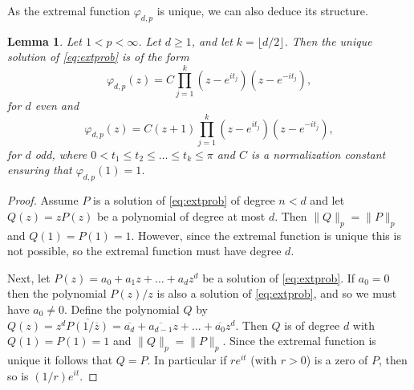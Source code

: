 \documentclass{amsart}
\theoremstyle{plain}
\newtheorem{lemma}[theorem]{Lemma}
\theoremstyle{remark}
\begin{document}
	
	As the extremal function $\varphi_{d, p}$ is unique, we can also deduce its structure. 
	
	\begin{lemma}\label{lem:structure}
		Let $1<p<\infty$. Let $d \geq 1$, and let $k=\lfloor d/2 \rfloor$. Then the unique solution of \eqref{eq:extprob} is of the form
		\[\varphi_{d, p}(z)= C\prod_{j=1}^{k} (z-e^{i t_j})(z-e^{-i t_j}),\]
		for $d$ even and 
		\[\varphi_{d, p}(z)=C(z+1) \prod_{j=1}^{k} (z-e^{i t_j})(z-e^{-i t_j}),\]
		for $d$ odd, where $0 < t_1 \leq t_2 \leq \dots \leq t_{k} \leq \pi$ and $C$ is a normalization constant ensuring that $\varphi_{d,p}(1)=1$.
	\end{lemma}
	
	\begin{proof}
		Assume $P$ is a solution of \eqref{eq:extprob} of degree $n<d$ and let $Q(z)=zP(z)$ be a polynomial of degree at most $d$. Then $\|Q\|_p=\|P\|_p$ and $Q(1)=P(1)=1$. However, since the extremal function is unique this is not possible, so the extremal function must have degree $d$.
		
		Next, let $P(z)=a_0+a_1 z + \dots + a_d z^d$ be a solution of \eqref{eq:extprob}. If $a_0=0$ then the polynomial $P(z)/z$ is also a solution of \eqref{eq:extprob}, and so we must have $a_0 \neq 0$. Define the polynomial $Q$ by $Q(z)=z^d \overline{P(1/\overline{z})}=\overline{a_d}+ \overline{a_{d-1}}z + \dots + \overline{a_0}z^d$. Then $Q$ is of degree $d$ with $Q(1)=P(1)=1$ and $\|Q\|_p=\|P\|_p$. Since the extremal function is unique it follows that $Q=P$. In particular if $re^{i t}$ (with $r>0$) is a zero of $P$, then so is $(1/r) e^{i t}$. 
		

\end{proof}
\end{document}
